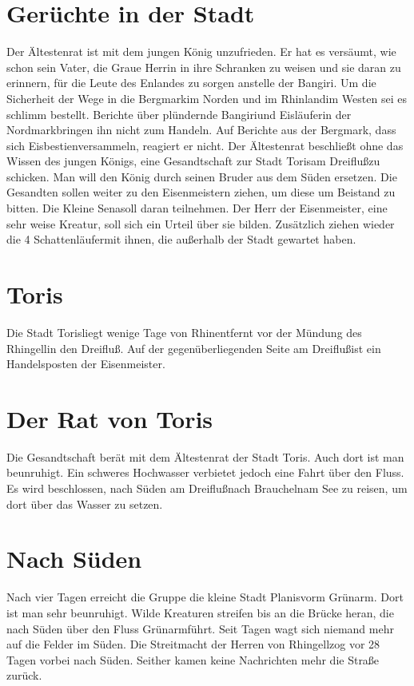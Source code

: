 \documentclass[12pt,a4paper,onecolumn,twoside,ngerman]{book}
\newcommand{\Sena}{Sena}
\newcommand{\Bangiri}{Bangiri}
\newcommand{\Enland}{Enland}
\newcommand{\Schattenlaufer}{Schattenläufer}
\newcommand{\Nordmark}{Nordmark}
\newcommand{\Bergmark}{Bergmark}
\newcommand{\Eislaufer}{Eisläufer}
\newcommand{\Eisbestien}{Eisbestien}
\newcommand{\Rhinland}{Rhinland}
\newcommand{\Rhingell}{Rhingell}
\newcommand{\Rhin}{Rhin}
\newcommand{\Dreifluss}{Dreifluß}
\newcommand{\Toris}{Toris}
\newcommand{\Planis}{Planis}
\newcommand{\Grunarm}{Grünarm}
\newcommand{\Braucheln}{Braucheln}
\newcommand{\Eisenmeister}{Eisenmeister}
\begin{document}
\section{Gerüchte in der Stadt}
Der Ältestenrat ist mit dem jungen König unzufrieden. Er hat es versäumt, wie schon sein Vater, die Graue Herrin in ihre Schranken zu weisen und sie daran zu erinnern, für die Leute des \Enland{es} zu sorgen anstelle der \Bangiri. Um die Sicherheit der Wege in die \Bergmark im Norden und im \Rhinland im Westen sei es schlimm bestellt. Berichte über plündernde \Bangiri und \Eislaufer in der \Nordmark bringen ihn nicht zum Handeln. Auf Berichte aus der \Bergmark, dass sich \Eisbestien versammeln, reagiert er nicht.
Der Ältestenrat beschließt ohne das Wissen des jungen Königs, eine Gesandtschaft zur Stadt \Toris am \Dreifluss zu schicken. Man will den König durch seinen Bruder aus dem Süden ersetzen. Die Gesandten sollen weiter zu den \Eisenmeister{n} ziehen, um diese um Beistand zu bitten. Die Kleine \Sena soll daran teilnehmen. Der Herr der \Eisenmeister, eine sehr weise Kreatur, soll sich ein Urteil über sie bilden. Zusätzlich ziehen wieder die 4 \Schattenlaufer mit ihnen, die außerhalb der Stadt gewartet haben.

\section{\Toris}
Die Stadt \Toris liegt wenige Tage von \Rhin entfernt vor der Mündung des \Rhingell in den \Dreifluss. Auf der gegenüberliegenden Seite am \Dreifluss ist ein Handelsposten der \Eisenmeister.

\section{Der Rat von \Toris}
Die Gesandtschaft berät mit dem Ältestenrat der Stadt \Toris. Auch dort ist man beunruhigt. Ein schweres Hochwasser verbietet jedoch eine Fahrt über den Fluss. Es wird beschlossen, nach Süden am \Dreifluss nach \Braucheln am See zu reisen, um dort über das Wasser zu setzen.

\section{Nach Süden}
Nach vier Tagen erreicht die Gruppe die kleine Stadt \Planis vorm \Grunarm. Dort ist man sehr beunruhigt. Wilde Kreaturen streifen bis an die Brücke heran, die nach Süden über den Fluss \Grunarm führt. Seit Tagen wagt sich niemand mehr auf die Felder im Süden. Die Streitmacht der Herren von \Rhingell zog vor 28 Tagen vorbei nach Süden. Seither kamen keine Nachrichten mehr die Straße zurück.
 
\end{document}
